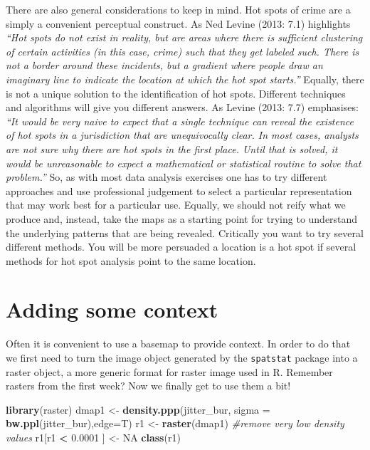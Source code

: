 \documentclass[]{book}
\newenvironment{Shaded}{\begin{snugshade}}{\end{snugshade}}
\newcommand{\CommentTok}[1]{\textcolor[rgb]{0.56,0.35,0.01}{\textit{#1}}}
\newcommand{\DataTypeTok}[1]{\textcolor[rgb]{0.13,0.29,0.53}{#1}}
\newcommand{\FloatTok}[1]{\textcolor[rgb]{0.00,0.00,0.81}{#1}}
\newcommand{\KeywordTok}[1]{\textcolor[rgb]{0.13,0.29,0.53}{\textbf{#1}}}
\newcommand{\NormalTok}[1]{#1}
\newcommand{\OperatorTok}[1]{\textcolor[rgb]{0.81,0.36,0.00}{\textbf{#1}}}
\newcommand{\OtherTok}[1]{\textcolor[rgb]{0.56,0.35,0.01}{#1}}
\newcommand{\StringTok}[1]{\textcolor[rgb]{0.31,0.60,0.02}{#1}}
\begin{document}
There are also general considerations to keep in mind. Hot spots of crime are a simply a convenient perceptual construct. As Ned Levine (2013: 7.1) highlights \emph{``Hot spots do not exist in reality, but are areas where there is sufficient clustering of certain activities (in this case, crime) such that they get labeled such. There is not a border around these incidents, but a gradient where people draw an imaginary line to indicate the location at which the hot spot starts.''} Equally, there is not a unique solution to the identification of hot spots. Different techniques and algorithms will give you different answers. As Levine (2013: 7.7) emphasises: \emph{``It would be very naive to expect that a single technique can reveal the existence of hot spots in a jurisdiction that are unequivocally clear. In most cases, analysts are not sure why there are hot spots in the first place. Until that is solved, it would be unreasonable to expect a mathematical or statistical routine to solve that problem.''} So, as with most data analysis exercises one has to try different approaches and use professional judgement to select a particular representation that may work best for a particular use. Equally, we should not reify what we produce and, instead, take the maps as a starting point for trying to understand the underlying patterns that are being revealed. Critically you want to try several different methods. You will be more persuaded a location is a hot spot if several methods for hot spot analysis point to the same location.

\hypertarget{adding-some-context}{%
\section{Adding some context}\label{adding-some-context}}

Often it is convenient to use a basemap to provide context. In order to do that we first need to turn the image object generated by the \texttt{spatstat} package into a raster object, a more generic format for raster image used in R. Remember rasters from the first week? Now we finally get to use them a bit!

\begin{Shaded}
\begin{Highlighting}[]
\KeywordTok{library}\NormalTok{(raster)}
\NormalTok{dmap1 <-}\StringTok{ }\KeywordTok{density.ppp}\NormalTok{(jitter_bur, }\DataTypeTok{sigma =} \KeywordTok{bw.ppl}\NormalTok{(jitter_bur),}\DataTypeTok{edge=}\NormalTok{T)}
\NormalTok{r1 <-}\StringTok{ }\KeywordTok{raster}\NormalTok{(dmap1)}
\CommentTok{#remove very low density values}
\NormalTok{r1[r1 }\OperatorTok{<}\StringTok{ }\FloatTok{0.0001}\NormalTok{ ] <-}\StringTok{ }\OtherTok{NA}
\KeywordTok{class}\NormalTok{(r1)}
\end{Highlighting}
\end{Shaded}
\end{document}
